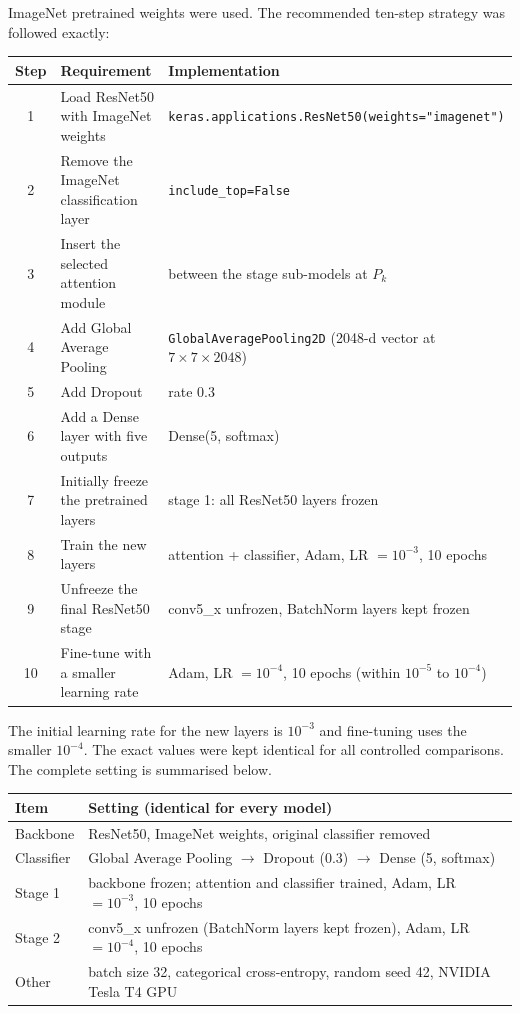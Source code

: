 \documentclass[11pt]{article}
\begin{document}
ImageNet pretrained weights were used. The recommended ten-step strategy was
followed exactly:

\begin{center}
\small
\begin{tabular}{|c|l|p{8.6cm}|}
\hline
Step & Requirement & Implementation\\
\hline
1 & Load ResNet50 with ImageNet weights & \texttt{keras.applications.ResNet50(weights="imagenet")}\\
2 & Remove the ImageNet classification layer & \texttt{include\_top=False}\\
3 & Insert the selected attention module & between the stage sub-models at $P_k$\\
4 & Add Global Average Pooling & \texttt{GlobalAveragePooling2D} (2048-d vector at $7\times7\times2048$)\\
5 & Add Dropout & rate 0.3\\
6 & Add a Dense layer with five outputs & Dense(5, softmax)\\
7 & Initially freeze the pretrained layers & stage 1: all ResNet50 layers frozen\\
8 & Train the new layers & attention + classifier, Adam, LR $=10^{-3}$, 10 epochs\\
9 & Unfreeze the final ResNet50 stage & conv5\_x unfrozen, BatchNorm layers kept frozen\\
10 & Fine-tune with a smaller learning rate & Adam, LR $=10^{-4}$, 10 epochs (within $10^{-5}$ to $10^{-4}$)\\
\hline
\end{tabular}
\end{center}

The initial learning rate for the new layers is $10^{-3}$ and fine-tuning uses
the smaller $10^{-4}$. The exact values were kept identical for all
controlled comparisons. The complete setting is summarised below.

\begin{center}
\begin{tabular}{|l|p{11.5cm}|}
\hline
Item & Setting (identical for every model)\\
\hline
Backbone & ResNet50, ImageNet weights, original classifier removed\\
Classifier & Global Average Pooling $\rightarrow$ Dropout (0.3) $\rightarrow$ Dense (5, softmax)\\
Stage 1 & backbone frozen; attention and classifier trained, Adam, LR $=10^{-3}$, 10 epochs\\
Stage 2 & conv5\_x unfrozen (BatchNorm layers kept frozen), Adam, LR $=10^{-4}$, 10 epochs\\
Other & batch size 32, categorical cross-entropy, random seed 42, NVIDIA Tesla T4 GPU\\
\hline
\end{tabular}
\end{center}
\end{document}
